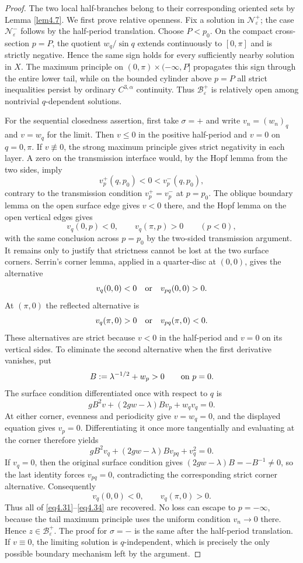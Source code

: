 \documentclass[11pt,reqno]{amsart}
\numberwithin{equation}{section}
\theoremstyle{definition}
\theoremstyle{remark}
\begin{document}
\begin{proof}
The two local half-branches belong to their corresponding oriented
sets by Lemma \ref{lem4.7}.  We first prove relative openness.  Fix a solution in
$\mathcal N_\varepsilon^+$; the case
$\mathcal N_\varepsilon^-$ follows by the half-period translation.
Choose $P<p_0$.  On the compact cross-section $p=P$, the quotient
$w_q/\sin q$ extends continuously to $[0,\pi]$ and is strictly
negative.  Hence the same sign holds for every sufficiently nearby
solution in $X$.  The maximum principle on
$(0,\pi)\times(-\infty,P]$ propagates this sign through the entire
lower tail, while on the bounded cylinder above $p=P$ all strict
inequalities persist by ordinary $C^{3,\alpha}$ continuity.  Thus
$\mathscr B_\varepsilon^+$ is relatively open among nontrivial
$q$-dependent solutions.

For the sequential closedness assertion, first take $\sigma=+$ and
write $v_n=(w_n)_q$ and $v=w_q$ for the limit.  Then $v\leq0$ in the
positive half-period and $v=0$ on $q=0,\pi$.  If $v\not\equiv0$, the
strong maximum principle gives strict negativity in each layer.  A
zero on the transmission interface would, by the Hopf lemma from the
two sides, imply
\[
 v_p^+(q,p_0)<0<v_p^-(q,p_0),
\]
contrary to the transmission condition $v_p^+=v_p^-$ at $p=p_0$.
The oblique boundary lemma on the open surface edge gives
$v<0$ there, and the Hopf lemma on the open vertical edges gives
\[
 v_q(0,p)<0,\qquad v_q(\pi,p)>0\qquad(p<0),
\]
with the same conclusion across $p=p_0$ by the two-sided
transmission argument.  It remains only to justify that strictness
cannot be lost at the two surface corners.  Serrin's corner lemma,
applied in a quarter-disc at $(0,0)$, gives the alternative
\[
 v_q(0,0)<0\quad\hbox{or}\quad v_{pq}(0,0)>0.
\]
At $(\pi,0)$ the reflected alternative is
\[
 v_q(\pi,0)>0\quad\hbox{or}\quad v_{pq}(\pi,0)<0.
\]
These alternatives are strict because $v<0$ in the half-period and
$v=0$ on its vertical sides.  To eliminate the second alternative
when the first derivative vanishes, put
\[
 B:=\lambda^{-1/2}+w_p>0\qquad\hbox{on }p=0.
\]
The surface condition differentiated once with respect to $q$ is
\[
 gB^2v+(2gw-\lambda)Bv_p+w_qv_q=0.
\]
At either corner, evenness and periodicity give
$v=w_q=0$, and the displayed equation gives $v_p=0$.  Differentiating
it once more tangentially and evaluating at the corner therefore
yields
\[
 gB^2v_q+(2gw-\lambda)Bv_{pq}+v_q^2=0.
\]
If $v_q=0$, then the original surface condition gives
$(2gw-\lambda)B=-B^{-1}\ne0$, so
the last identity forces $v_{pq}=0$, contradicting
the corresponding strict corner alternative.  Consequently
\[
 v_q(0,0)<0,\qquad v_q(\pi,0)>0.
\]
Thus all of \eqref{eq4.31}--\eqref{eq4.34} are recovered.  No loss
can escape to $p=-\infty$, because the tail maximum principle uses
the uniform condition $v_n\to0$ there.  Hence
$z\in\mathscr B_\varepsilon^+$.  The proof for $\sigma=-$ is the
same after the half-period translation.
If $v\equiv0$, the limiting solution is $q$-independent, which is
precisely the only possible boundary mechanism left by the
argument.
\end{proof}
\end{document}
